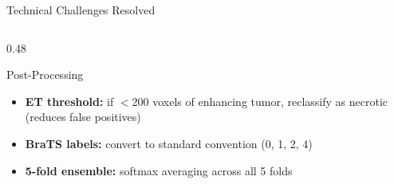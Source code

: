 \documentclass[aspectratio=169, dvipsnames]{beamer}
\begin{document}
\begin{frame}{Technical Challenges Resolved}
\begin{columns}
\begin{column}{0.48\textwidth}
            \vspace{0.2em}

            \begin{block}{ Post-Processing}
                \small
                \begin{itemize}
                    \item \textbf{ET threshold:} if $<$200 voxels of enhancing tumor, reclassify as necrotic (reduces false positives)
                    \item \textbf{BraTS labels:} convert to standard convention (0, 1, 2, 4)
                    \item \textbf{5-fold ensemble:} softmax averaging across all 5 folds
                \end{itemize}
            \end{block}
        \end{column}
    \end{columns}
\end{frame}
\end{document}
